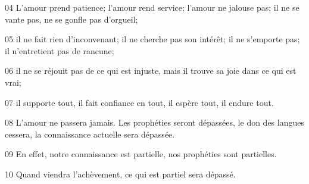 
04 L’amour prend patience; l’amour rend service; l’amour ne jalouse pas; il ne se vante pas, ne se gonfle pas d’orgueil;

05 il ne fait rien d’inconvenant; il ne cherche pas son intérêt; il ne s’emporte pas; il n’entretient pas de rancune;

06 il ne se réjouit pas de ce qui est injuste, mais il trouve sa joie dans ce qui est vrai;

07 il supporte tout, il fait confiance en tout, il espère tout, il endure tout.

08 L’amour ne passera jamais. Les prophéties seront dépassées, le don des langues cessera, la connaissance actuelle sera dépassée.

09 En effet, notre connaissance est partielle, nos prophéties sont partielles.

10 Quand viendra l’achèvement, ce qui est partiel sera dépassé.
